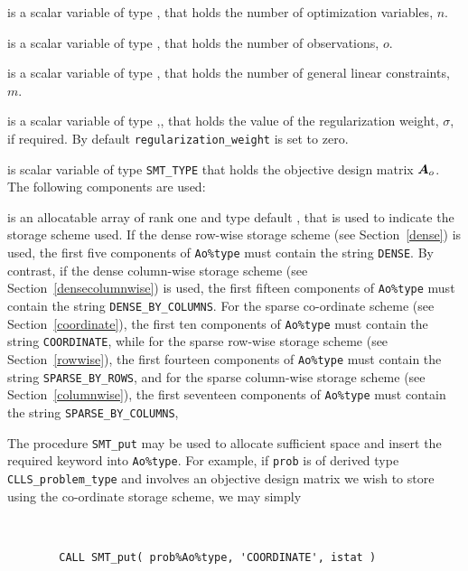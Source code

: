 \documentclass{galahad}
\newcommand{\packagename}{CLLS}
\begin{document}
\begin{description}

 is a scalar variable of type \integer,
 that holds the number of optimization variables, $n$.

 is a scalar variable of type \integer,
 that holds the number of observations, $o$.

 is a scalar variable of type \integer,
 that holds the number of general linear constraints, $m$.

 is a scalar variable of type \realdp,,
 that holds the value of the regularization weight, $\sigma$, if required.
 By default {\tt regularization\_weight} is set to zero.

 is scalar variable of type {\tt SMT\_TYPE}
that holds the objective design matrix ${\bm{A}}_o$.
The following components are used:

\begin{description}

 is an allocatable array of rank one and type default \character,
that is used to indicate the storage scheme used.
If the dense row-wise storage scheme (see Section~\ref{dense}) is used,
the first five components of {\tt Ao\%type} must contain the
string {\tt DENSE}.
By contrast, if the dense column-wise storage scheme
(see Section~\ref{densecolumnwise}) is used,
the first fifteen components of {\tt Ao\%type} must contain the
string {\tt DENSE\_BY\_COLUMNS}.
For the sparse co-ordinate scheme (see Section~\ref{coordinate}),
the first ten components of {\tt Ao\%type} must contain the
string {\tt COORDINATE}, while
for the sparse row-wise storage scheme (see Section~\ref{rowwise}),
the first fourteen components of {\tt Ao\%type} must contain the
string {\tt SPARSE\_BY\_ROWS},
and for the sparse column-wise storage scheme (see Section~\ref{columnwise}),
the first seventeen components of {\tt Ao\%type} must contain the
string {\tt SPARSE\_BY\_COLUMNS},

The procedure {\tt SMT\_put} may be used to allocate sufficient space and
insert the required keyword into {\tt Ao\%type}. For example,
if {\tt prob} is of derived type {\tt \packagename\_problem\_type}
and involves an objective design matrix we wish to store using the co-ordinate
storage scheme, we may simply
{\tt
\begin{verbatim}
        CALL SMT_put( prob%Ao%type, 'COORDINATE', istat )
\end{verbatim}
}
\noindent


\end{description}
\end{description}
\end{document}
